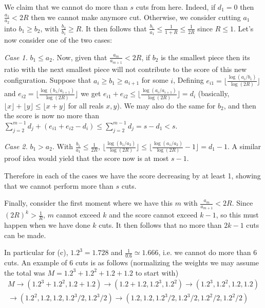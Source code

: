 \documentclass[11pt,a4paper]{article}
\begin{document}
\begin{enumerate}
    We claim that we cannot do more than $s$ cuts from here. 
    Indeed, if $d_1=0$ then $\frac{a_1}{a_2} < 2R$ then we cannot make anymore cut. 
    Otherwise, we consider cutting $a_1$ into $b_1\ge b_2$, 
    with $\frac{b_2}{b_1}\ge R$. 
    It then follows that $\frac{b_1}{a_1}\le \frac{1}{1+R}\le \frac{1}{2R}$ since $R\le 1$. 
    Let's now consider one of the two cases: 
    
    \emph{Case 1.} 
    $b_1\le a_2$. 
    Now, given that $\frac{a_m}{a_{m+1}} < 2R$, 
    if $b_2$ is the smallest piece then its ratio with the next smallest piece will not contribute to the score of this new configuration. 
    Suppose that $a_i\ge b_1\ge a_{i+1}$ for some $i$, 
    Defining $e_{i1} = \lfloor \frac{\log (a_i/b_1)}{\log (2R)}\rfloor$ and 
    $e_{i2}=\lfloor \frac{\log (b_1/a_{i+1})}{\log (2R)}\rfloor$ we get 
    $e_{i1}+e_{i2}\le \lfloor \frac{\log (a_i/a_{i+1})}{\log (2R)}\rfloor=d_i$ 
    (basically, $\lfloor x\rfloor + \lfloor y\rfloor \le \lfloor x+y\rfloor$ for all reals $x, y$). 
    We may also do the same for $b_2$, 
    and then the score is now no more than $\sum_{j=2}^{m-1}d_j + (e_{i1}+e_{i2} - d_i)\le \sum_{j=2}^{m-1}d_j =s-d_1 < s$. 
    
    \emph{Case 2.} $b_1 > a_2$. 
    With $\frac{b_1}{a_1} \le \frac{1}{2R}$, $\lfloor \frac{\log (b_1/a_2)}{\log (2R)}\rfloor
    \le \lfloor \frac{\log (a_1/a_2)}{\log (2R)} - 1\rfloor
    =d_1-1$. 
    A similar proof idea would yield that the score now is at most $s-1$. 
    
    Therefore in each of the cases we have the score decreasing by at least 1, showing that we cannot perform more than $s$ cuts. 
    
    Finally, consider the first moment where we have this $m$ with $\frac{a_m}{a_{m+1}} < 2R$. 
    Since $(2R)^k > \frac{1}{R}$, 
    $m$ cannot exceed $k$ and the score cannot exceed $k-1$, so this must happen when we have done $k$ cuts. 
    It then follows that no more than $2k-1$ cuts can be made. 
    
    In particular for (c), $1.2^3=1.728$ and $\frac{1}{0.6}\simeq 1.666$, i.e. we cannot do more than 6 cuts. 
    An example of 6 cuts is as follows (normalizing the weights we may assume the total was $M = 1.2^3+1.2^2+1.2+1.2$ to start with)
    \begin{equation}
    	\begin{aligned}
    		M\to (1.2^3+1.2^2, 1.2+1.2)
    		\to (1.2+1.2, 1.2^3, 1.2^2)
    		\to (1.2^3, 1.2^2, 1.2, 1.2)
    		\\
    		\to (1.2^2, 1.2, 1.2, 1.2^3/2, 1.2^3/2)
    		\to (1.2, 1.2, 1.2^3/2, 1.2^3/2, 1.2^2/2, 1.2^2/2)
    	\end{aligned}
    \end{equation}
	

\end{enumerate}
\end{document}
